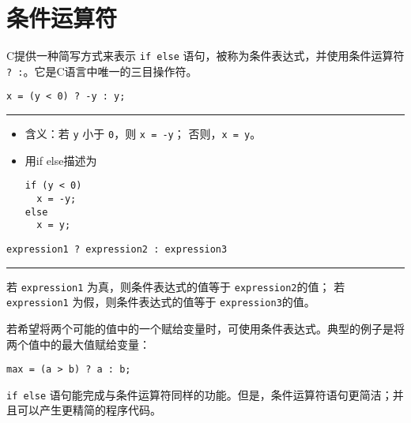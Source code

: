\section{条件运算符}
\begin{frame}[fragile]\ft{\secname}
  C提供一种简写方式来表示 \lstinline|if else| 语句，被称为条件表达式，并使用条件运算符 \lstinline|? :|。它是C语言中唯一的三目操作符。
\end{frame}

\begin{frame}[fragile]\ft{\secname}
\begin{lstlisting}[title=求绝对值]
x = (y < 0) ? -y : y;
\end{lstlisting}
\rule{\textwidth}{.8mm} \pause \vspace{.05in}

\begin{itemize}
\item
  含义：若 \lstinline|y| 小于 \lstinline|0|，则 \lstinline|x = -y|；
  否则，\lstinline|x = y|。\\[0.1in]
\item 用if else描述为
\begin{lstlisting}
if (y < 0)
  x = -y;
else
  x = y;  
\end{lstlisting}
\end{itemize}
\end{frame}

\begin{frame}[fragile]\ft{\secname}
\begin{lstlisting}[title=条件表达式的语法]
expression1 ? expression2 : expression3
\end{lstlisting}
\rule{\textwidth}{.8mm} \pause \vspace{.05in}

若 \lstinline|expression1| 为真，则条件表达式的值等于 \lstinline|expression2|的值；
若 \lstinline|expression1| 为假，则条件表达式的值等于 \lstinline|expression3|的值。
\end{frame}

\begin{frame}[fragile]\ft{\secname}
若希望将两个可能的值中的一个赋给变量时，可使用条件表达式。典型的例子是将两个值中的最大值赋给变量：
\begin{lstlisting}[frame=single]
max = (a > b) ? a : b;
\end{lstlisting}
\end{frame}

\begin{frame}[fragile]\ft{\secname}
\lstinline|if else| 语句能完成与条件运算符同样的功能。但是，条件运算符语句更简洁；并且可以产生更精简的程序代码。
\end{frame}

